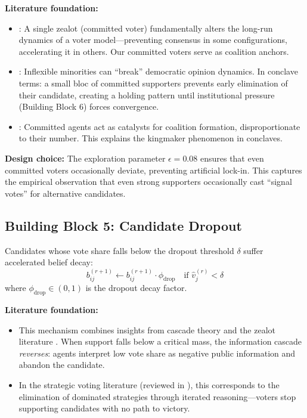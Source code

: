 \textbf{Literature foundation:}
\begin{itemize}[nosep]
\item \citet{mobilia2003single}: A single zealot (committed voter) fundamentally
      alters the long-run dynamics of a voter model---preventing consensus in some
      configurations, accelerating it in others. Our committed voters serve as
      coalition anchors.
\item \citet{galam2007inflexible}: Inflexible minorities can ``break'' democratic
      opinion dynamics. In conclave terms: a small bloc of committed supporters
      prevents early elimination of their candidate, creating a holding pattern
      until institutional pressure (Building Block 6) forces convergence.
\item \citet{masuda2012evolution}: Committed agents act as catalysts for coalition
      formation, disproportionate to their number. This explains the kingmaker
      phenomenon in conclaves.
\end{itemize}

\textbf{Design choice:} The exploration parameter $\epsilon = 0.08$ ensures that even
committed voters occasionally deviate, preventing artificial lock-in. This captures
the empirical observation that even strong supporters occasionally cast ``signal votes''
for alternative candidates.


\subsection{Building Block 5: Candidate Dropout}
\label{sec:bp-dropout}

\begin{tcolorbox}[colback=blue!3!white, colframe=blue!60!black, title=Axiom VTM-5: Candidate Viability]
Candidates whose vote share falls below the dropout threshold $\delta$ suffer
accelerated belief decay:
\begin{equation}
b_{ij}^{(r+1)} \leftarrow b_{ij}^{(r+1)} \cdot \phi_{\text{drop}} \quad \text{if } \hat{v}_j^{(r)} < \delta
\label{eq:dropout}
\end{equation}
where $\phi_{\text{drop}} \in (0,1)$ is the dropout decay factor.
\end{tcolorbox}

\textbf{Literature foundation:}
\begin{itemize}[nosep]
\item This mechanism combines insights from cascade theory \citep{bikhchandani1992theory}
      and the zealot literature \citep{galam2007inflexible}. When support falls below
      a critical mass, the information cascade \emph{reverses}: agents interpret low
      vote share as negative public information and abandon the candidate.
\item In the strategic voting literature (reviewed in \citet{mckelvey1995quantal}),
      this corresponds to the elimination of dominated strategies through iterated
      reasoning---voters stop supporting candidates with no path to victory.
\end{itemize}

